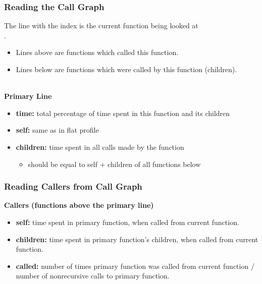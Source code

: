 \documentclass[aspectratio=43]{beamer}
\newenvironment{changemargin}[1]{%
  \begin{list}{}{%
    \setlength{\topsep}{0pt}%
    \setlength{\leftmargin}{#1}%
    \setlength{\rightmargin}{1em}
    \setlength{\listparindent}{\parindent}%
    \setlength{\itemindent}{\parindent}%
    \setlength{\parsep}{\parskip}%
  }%
  \item[]}{\end{list}}
\begin{document}
\begin{frame}[fragile]
  \frametitle{Reading the Call Graph}

  \begin{changemargin}{1.5cm}
    The line with the index is the current function being looked at\\
      \qquad {}.\\
\begin{itemize}
    \item Lines above are functions which called this function.
    \item Lines below are functions which were called by this function
      (children).
  \end{itemize}
~\\
  {\bf Primary Line}

  \begin{itemize}  
    \item {\bf time:} total percentage of time spent in this function and its
      children
    \item {\bf self:} same as in flat profile
    \item {\bf children:} time spent in all calls made by the function
      \begin{itemize}
        \item should be equal to self + children of all functions below
      \end{itemize}
  \end{itemize}
  \end{changemargin}
\end{frame}

\begin{frame}[fragile]
  \frametitle{Reading Callers from Call Graph}

  \begin{changemargin}{2cm}
  {\bf Callers (functions above the primary line)}
  \begin{itemize}  
    \item {\bf self:} time spent in primary function, when called from current
      function.
    \item {\bf children:} time spent in primary function's children, when
      called from current function.
    \item {\bf called:} number of times primary function was called from current
      function / number of nonrecursive calls to primary function.
  \end{itemize}
  \end{changemargin}
\end{frame}
\end{document}
